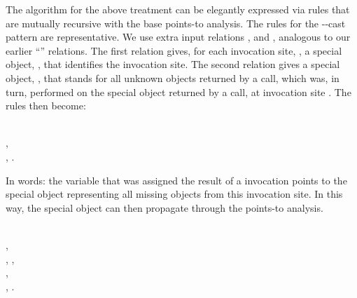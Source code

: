 

The algorithm for the above treatment can be elegantly expressed via
rules that are mutually recursive with the base points-to analysis.
The rules for the --cast pattern
are representative. We use extra input relations
, and
, analogous to our earlier
``'' relations. The first relation gives, for
each  invocation site, , a special object,
, that identifies the invocation site. The second relation
gives a special object, , that stands for all unknown objects
returned by a  call, which was, in turn, performed on
the special object returned by a  call, at invocation site
. The rules then become:

\begin{minipage}{0.95\columnwidth}
  \begin{rules}
      \\
    \tab {}, \\
    \tab {}, .\\
  \end{rules}
\end{minipage}

\noindent In words: the variable that was assigned the result of a 
invocation points to the special object representing all missing objects from
this invocation site. In this way, the special object can then propagate through
the points-to analysis.

\begin{minipage}{0.95\columnwidth}
  \begin{rules}
      \\
    \tab {}, \\
    \tab {}, , \\
    \tab {}, \\
    \tab {}, .
  \end{rules}
\end{minipage}

